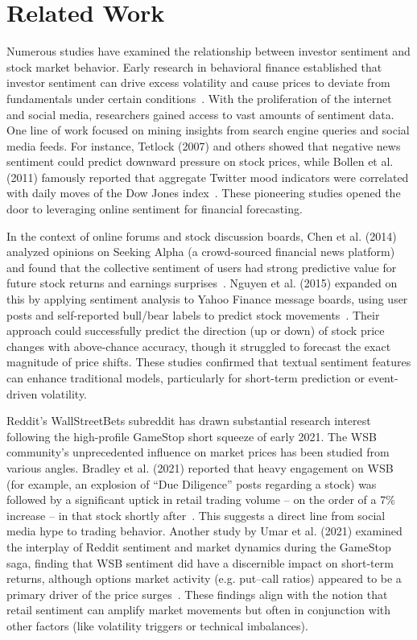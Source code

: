 \documentclass[conference]{IEEEtran}
\begin{document}
\section{Related Work}
Numerous studies have examined the relationship between investor sentiment and stock market behavior. Early research in behavioral finance established that investor sentiment can drive excess volatility and cause prices to deviate from fundamentals under certain conditions~\cite{tetlock2007giving}. With the proliferation of the internet and social media, researchers gained access to vast amounts of sentiment data. One line of work focused on mining insights from search engine queries and social media feeds. For instance, Tetlock (2007) and others showed that negative news sentiment could predict downward pressure on stock prices, while Bollen et al. (2011) famously reported that aggregate Twitter mood indicators were correlated with daily moves of the Dow Jones index~\cite{bollen2011twitter}. These pioneering studies opened the door to leveraging online sentiment for financial forecasting.

In the context of online forums and stock discussion boards, Chen et al. (2014) analyzed opinions on Seeking Alpha (a crowd-sourced financial news platform) and found that the collective sentiment of users had strong predictive value for future stock returns and earnings surprises~\cite{chen2014wisdom}. Nguyen et al. (2015) expanded on this by applying sentiment analysis to Yahoo Finance message boards, using user posts and self-reported bull/bear labels to predict stock movements~\cite{nguyen2015sentiment}. Their approach could successfully predict the direction (up or down) of stock price changes with above-chance accuracy, though it struggled to forecast the exact magnitude of price shifts. These studies confirmed that textual sentiment features can enhance traditional models, particularly for short-term prediction or event-driven volatility.

Reddit’s WallStreetBets subreddit has drawn substantial research interest following the high-profile GameStop short squeeze of early 2021. The WSB community’s unprecedented influence on market prices has been studied from various angles. Bradley et al. (2021) reported that heavy engagement on WSB (for example, an explosion of “Due Diligence” posts regarding a stock) was followed by a significant uptick in retail trading volume – on the order of a 7\% increase – in that stock shortly after~\cite{bradley2021place}. This suggests a direct line from social media hype to trading behavior. Another study by Umar et al. (2021) examined the interplay of Reddit sentiment and market dynamics during the GameStop saga, finding that WSB sentiment did have a discernible impact on short-term returns, although options market activity (e.g. put–call ratios) appeared to be a primary driver of the price surges~\cite{umar2021tale}. These findings align with the notion that retail sentiment can amplify market movements but often in conjunction with other factors (like volatility triggers or technical imbalances).
\end{document}
